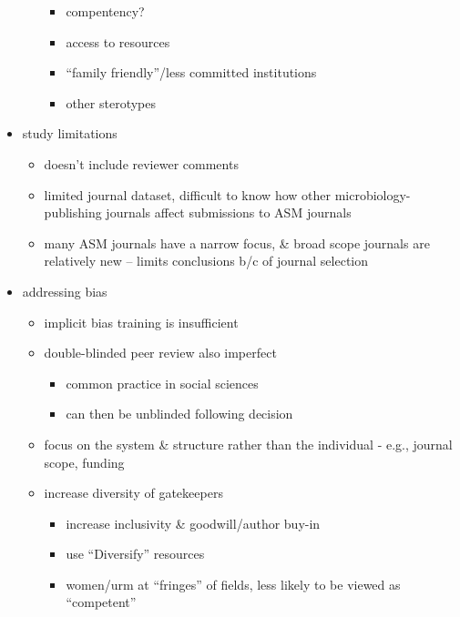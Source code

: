 \documentclass[11pt,]{article}
\providecommand{\tightlist}{%
  \setlength{\itemsep}{0pt}\setlength{\parskip}{0pt}}
\begin{document}
\begin{itemize}
\begin{itemize}
    \begin{itemize}
    \tightlist
    \item
      compentency?
    \item
      access to resources
    \item
      ``family friendly''/less committed institutions
    \item
      other sterotypes
    \end{itemize}
  \end{itemize}
\item
  study limitations

  \begin{itemize}
  \tightlist
  \item
    doesn't include reviewer comments
  \item
    limited journal dataset, difficult to know how other
    microbiology-publishing journals affect submissions to ASM journals
  \item
    many ASM journals have a narrow focus, \& broad scope journals are
    relatively new -- limits conclusions b/c of journal selection
  \end{itemize}
\item
  addressing bias

  \begin{itemize}
  \tightlist
  \item
    implicit bias training is insufficient
  \item
    double-blinded peer review also imperfect

    \begin{itemize}
    \tightlist
    \item
      common practice in social sciences
    \item
      can then be unblinded following decision
    \end{itemize}
  \item
    focus on the system \& structure rather than the individual - e.g.,
    journal scope, funding
  \item
    increase diversity of gatekeepers

    \begin{itemize}
    \tightlist
    \item
      increase inclusivity \& goodwill/author buy-in
    \item
      use ``Diversify'' resources
    \item
      women/urm at ``fringes'' of fields, less likely to be viewed as
      ``competent''
    \end{itemize}
  \end{itemize}
\end{itemize}
\end{document}
